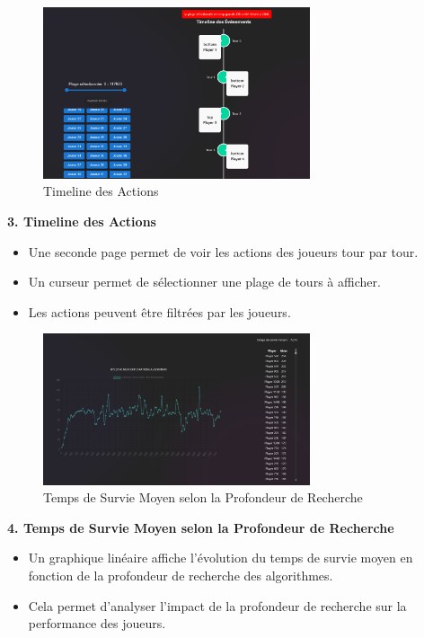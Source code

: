 \newpage

\begin{figure}[h]
	\centering
	\includegraphics[width=0.7\textwidth]{images/TimelineActions.png}
	\caption{Timeline des Actions}
	\label{TimelineActions}
\end{figure}
\textbf{3. Timeline des Actions}
\begin{itemize}
    \item Une seconde page permet de voir les actions des joueurs tour par tour.
    \item Un curseur permet de sélectionner une plage de tours à afficher.
    \item Les actions peuvent être filtrées par les joueurs.
\end{itemize}

\begin{figure}[h]
	\centering
	\includegraphics[width=0.7\textwidth]{images/SurvieMoyenProfondeur.png}
	\caption{Temps de Survie Moyen selon la Profondeur de Recherche}
	\label{SurvieMoyenProfondeur}
\end{figure}
\textbf{4. Temps de Survie Moyen selon la Profondeur de Recherche}
\begin{itemize}
    \item Un graphique linéaire affiche l'évolution du temps de survie moyen en fonction de la profondeur de recherche des algorithmes.
    \item Cela permet d'analyser l'impact de la profondeur de recherche sur la performance des joueurs.
\end{itemize}

